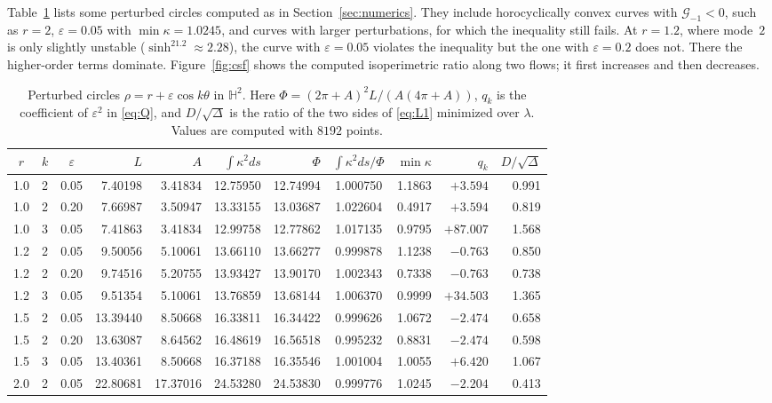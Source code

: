 \documentclass[11pt]{amsart}
\theoremstyle{definition}
\theoremstyle{remark}
\numberwithin{equation}{section}
\newcommand{\HH}{\mathbb{H}}
\newcommand{\eps}{\varepsilon}
\newcommand{\G}{\mathcal{G}}
\begin{document}
Table~\ref{tab:hyp} lists some perturbed circles computed as in Section~\ref{sec:numerics}. They include horocyclically convex curves with $\G_{-1}<0$, such as $r=2$, $\eps=0.05$ with $\min\kappa=1.0245$, and curves with larger perturbations, for which the inequality still fails. At $r=1.2$, where mode~$2$ is only slightly unstable ($\sinh^21.2\approx2.28$), the curve with $\eps=0.05$ violates the inequality but the one with $\eps=0.2$ does not. There the higher-order terms dominate. Figure~\ref{fig:csf} shows the computed isoperimetric ratio along two flows; it first increases and then decreases.

\begin{table}[t]
\centering
\small
\caption{Perturbed circles $\rho=r+\eps\cos k\theta$ in $\HH^2$. Here $\Phi=(2\pi+A)^2L/(A(4\pi+A))$, $q_k$ is the coefficient of $\eps^2$ in \eqref{eq:Q}, and $D/\sqrt\Delta$ is the ratio of the two sides of \eqref{eq:L1} minimized over $\lambda$. Values are computed with $8192$ points.}
\label{tab:hyp}
\begin{tabular}{cccrrrrcrrr}
\toprule
$r$ & $k$ & $\eps$ & $L$ & $A$ & $\int\kappa^2ds$ & $\Phi$ & $\int\kappa^2ds/\Phi$ & $\min\kappa$ & $q_k$ & $D/\sqrt\Delta$\\
\midrule
1.0 & 2 & 0.05 & 7.40198 & 3.41834 & 12.75950 & 12.74994 & 1.000750 & 1.1863 & $+3.594$ & 0.991\\
1.0 & 2 & 0.20 & 7.66987 & 3.50947 & 13.33155 & 13.03687 & 1.022604 & 0.4917 & $+3.594$ & 0.819\\
1.0 & 3 & 0.05 & 7.41863 & 3.41834 & 12.99758 & 12.77862 & 1.017135 & 0.9795 & $+87.007$ & 1.568\\
1.2 & 2 & 0.05 & 9.50056 & 5.10061 & 13.66110 & 13.66277 & 0.999878 & 1.1238 & $-0.763$ & 0.850\\
1.2 & 2 & 0.20 & 9.74516 & 5.20755 & 13.93427 & 13.90170 & 1.002343 & 0.7338 & $-0.763$ & 0.738\\
1.2 & 3 & 0.05 & 9.51354 & 5.10061 & 13.76859 & 13.68144 & 1.006370 & 0.9999 & $+34.503$ & 1.365\\
1.5 & 2 & 0.05 & 13.39440 & 8.50668 & 16.33811 & 16.34422 & 0.999626 & 1.0672 & $-2.474$ & 0.658\\
1.5 & 2 & 0.20 & 13.63087 & 8.64562 & 16.48619 & 16.56518 & 0.995232 & 0.8831 & $-2.474$ & 0.598\\
1.5 & 3 & 0.05 & 13.40361 & 8.50668 & 16.37188 & 16.35546 & 1.001004 & 1.0055 & $+6.420$ & 1.067\\
2.0 & 2 & 0.05 & 22.80681 & 17.37016 & 24.53280 & 24.53830 & 0.999776 & 1.0245 & $-2.204$ & 0.413\\

\end{tabular}
\end{table}
\end{document}
